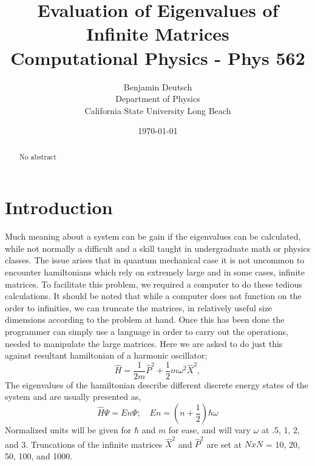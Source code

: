 \documentclass[12pt,letterpaper,notitlepage]{article}
\begin{document}




\title{%
	Evaluation of Eigenvalues of Infinite Matrices \\
\large Computational Physics - Phys 562}
\author{Benjamin Deutsch  \\
Department of Physics\\
California State University Long Beach}
\date{\today }

  
\maketitle



\begin{abstract}
No abstract    
\end{abstract}

\section{Introduction}

Much meaning about a system can be gain if the eigenvalues can be calculated, while not normally a difficult and a skill taught in undergraduate math or physics classes. The issue arises that in quantum mechanical case it is not uncommon to encounter hamiltonians which rely on extremely large and in some cases, infinite matrices. To facilitate this problem, we required a computer to do these tedious calculations. It should be noted that while a computer does not function on the order to infinities, we can truncate the matrices, in relatively useful size dimensions according to the problem at hand.  Once this has been done the programmer can simply use a language in order to carry out the operations, needed to manipulate the large matrices. Here we are asked to do just this against resultant hamiltonian of a harmonic oscillator;
	\begin{equation}
		\hat{H} = \frac{1}{2m}\hat{P}^2 + \frac{1}{2}m\omega^2\hat{X}^2,       
	\end{equation}
The eigenvalues of the hamiltonian describe different discrete energy states of the system and are usually presented as, 
	\begin{equation}
		\hat{H}\Psi = {En}\Psi ; \quad    {En} = (n + \frac{1}{2})\hbar\omega
	\end{equation} 
Normalized units will be given for $\hbar$ and $m$ for ease, and will vary $\omega$ at .5, 1, 2, and 3. Truncations of the infinite matrices $\hat{X}^2$ and $\hat{P}^2$ are set at $NxN$ = 10, 20, 50, 100, and 1000.
\end{document}
